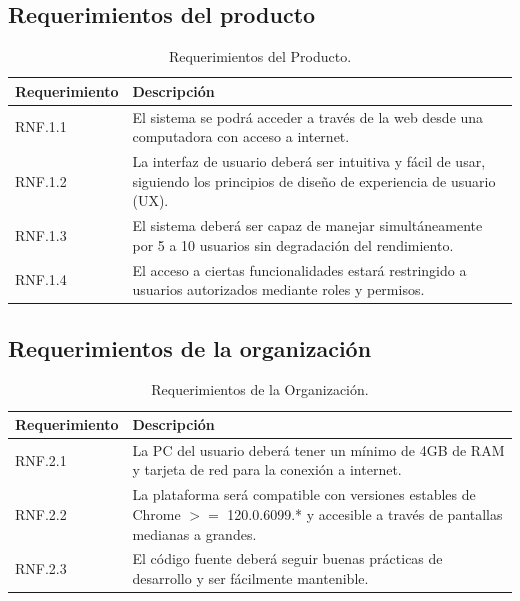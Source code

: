 \subsection{Requerimientos del producto}

\begin{table}[H]
    \centering
    \begin{tabular}{|l|p{10cm}|}
        \hline
        \textbf{Requerimiento} & \textbf{Descripción} \\
        \hline
        RNF.1.1 & El sistema se podrá acceder a través de la web desde una computadora con acceso a internet. \\
        \hline
        RNF.1.2 & La interfaz de usuario deberá ser intuitiva y fácil de usar, siguiendo los principios de diseño de experiencia de usuario (UX). \\
        \hline
        RNF.1.3 & El sistema deberá ser capaz de manejar simultáneamente por 5 a 10 usuarios sin degradación del rendimiento. \\
        \hline
        RNF.1.4 & El acceso a ciertas funcionalidades estará restringido a usuarios autorizados mediante roles y permisos. \\
        \hline
    \end{tabular}
    \caption{Requerimientos del Producto.}
    \label{tab:rnf-producto}
\end{table}

\subsection{Requerimientos de la organización}

\begin{table}[H]
    \centering
    \begin{tabular}{|l|p{10cm}|}
        \hline
        \textbf{Requerimiento} & \textbf{Descripción} \\
        \hline
        RNF.2.1 & La PC del usuario deberá tener un mínimo de 4GB de RAM y tarjeta de red para la conexión a internet. \\
        \hline
        RNF.2.2 & La plataforma será compatible con versiones estables de Chrome \(>=\) 120.0.6099.* y accesible a través de pantallas medianas a grandes. \\
        \hline
        RNF.2.3 & El código fuente deberá seguir buenas prácticas de desarrollo y ser fácilmente mantenible. \\
        \hline
    \end{tabular}
    \caption{Requerimientos de la Organización.}
    \label{tab:rnf-organizacion}
\end{table}

